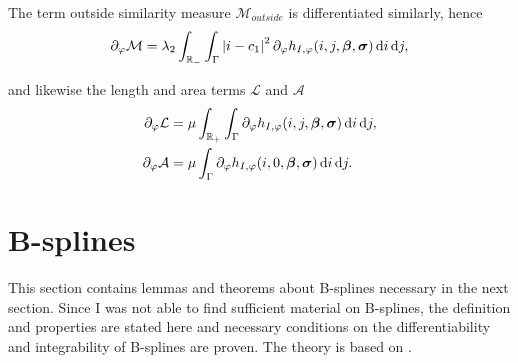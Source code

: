 The term outside similarity measure $\mathcal{M}_{outside}$ is differentiated similarly, hence
\begin{equation}
\partial_\varphi \mathcal{M} = \lambda_2\int_{\mathbb R_-} \int_{\Gamma} \left| {i-c_1} \right|^2 \partial_\varphi h_{I,\varphi}(i,j,\boldsymbol{\beta} ,\boldsymbol{\sigma} )\,{\rm d} i\,{\rm d} j,
\end{equation}

and likewise the length and area terms $\mathcal{L}$ and $\mathcal{A}$
\begin{align}
  \partial_\varphi \mathcal{L} &= \mu \int_{\mathbb R_+} \int_{\Gamma} \partial_\varphi h_{I,\varphi}(i,j,\boldsymbol{\beta} ,\boldsymbol{\sigma} )\,{\rm d} i\,{\rm d} j,\\
  \partial_\varphi \mathcal{A} &= \mu  \int_{\Gamma} \partial_\varphi h_{I,\varphi}(i,0,\boldsymbol{\beta} ,\boldsymbol{\sigma} )\,{\rm d} i\,{\rm d} j.
\end{align}

\section{B-splines}
This section contains lemmas and theorems about B-splines necessary in the next section. Since I was not able to find sufficient material on B-splines, the definition and properties are stated here and necessary conditions on the differentiability and integrability of B-splines are proven. The theory is based on \cite[chap.~6.5]{kin.02}.\\

